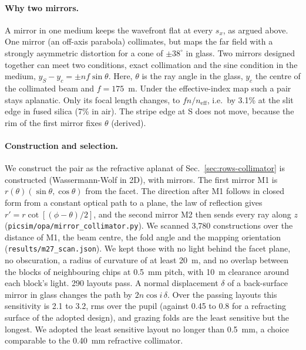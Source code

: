 \paragraph{Why two mirrors.} A mirror in one medium keeps the wavefront flat at every $s_x$, as argued above. One mirror (an off-axis parabola) collimates, but maps the far field with a strongly asymmetric distortion for a cone of $\pm38^\circ$ in glass. Two mirrors designed together can meet two conditions, exact collimation and the sine condition in the medium, $y_S-y_c=\pm nf\sin\theta$. Here, $\theta$ is the ray angle in the glass, $y_c$ the centre of the collimated beam and $f=175$~\textmu m. Under the effective-index map such a pair stays aplanatic. Only its focal length changes, to $fn/n_\mathrm{eff}$, i.e.\ by 3.1\% at the slit edge in fused silica (7\% in air). The stripe edge at S does not move, because the rim of the first mirror fixes $\theta$ (derived).

\paragraph{Construction and selection.} We construct the pair as the refractive aplanat of Sec.~\ref{sec:rows-collimator} is constructed (Wassermann-Wolf in 2D), with mirrors. The first mirror M1 is $r(\theta)(\sin\theta,\cos\theta)$ from the facet. The direction after M1 follows in closed form from a constant optical path to a plane, the law of reflection gives $r'=r\cot[(\phi-\theta)/2]$, and the second mirror M2 then sends every ray along $z$ (\texttt{picsim/\allowbreak opa/\allowbreak mirror\_collimator.py}). We scanned 3,780 constructions over the distance of M1, the beam centre, the fold angle and the mapping orientation (\texttt{results/\allowbreak m27\_scan.json}). We kept those with no light behind the facet plane, no obscuration, a radius of curvature of at least 20~\textmu m, and no overlap between the blocks of neighbouring chips at 0.5~mm pitch, with 10~\textmu m clearance around each block's light. 290 layouts pass. A normal displacement $\delta$ of a back-surface mirror in glass changes the path by $2n\cos i\,\delta$. Over the passing layouts this sensitivity is 2.1 to 3.2, rms over the pupil (against 0.45 to 0.8 for a refracting surface of the adopted design), and grazing folds are the least sensitive but the longest. We adopted the least sensitive layout no longer than 0.5~mm, a choice comparable to the 0.40~mm refractive collimator.

